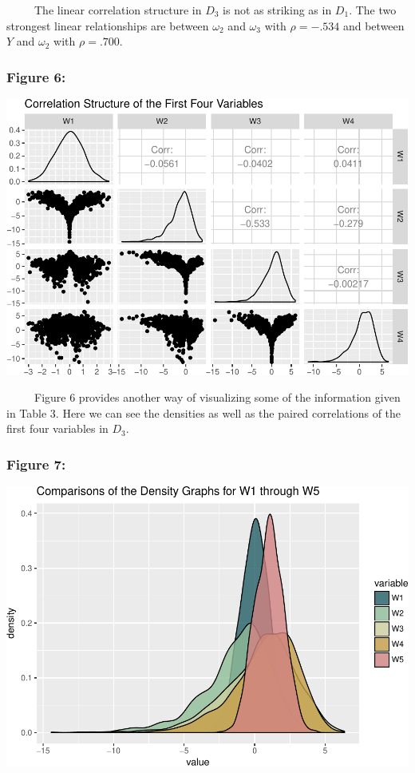 \documentclass[12pt,twoside]{reedthesis}
\begin{document}
  ~~~~~The linear correlation structure in \(D_3\) is not as striking as
  in \(D_1\). The two strongest linear relationships are between
  \(\omega_2\) and \(\omega_3\) with \(\rho = -.534\) and between \(Y\)
  and \(\omega_2\) with \(\rho = .700\).
  
  \subsubsection{Figure 6:}\label{figure-6}
  
  \begin{center}\includegraphics{Thesis_files/figure-latex/unnamed-chunk-7-1} \end{center}
  
  ~~~~~Figure 6 provides another way of visualizing some of the
  information given in Table 3. Here we can see the densities as well as
  the paired correlations of the first four variables in \(D_3\).
  
  \subsubsection{Figure 7:}\label{figure-7}
  
  \begin{center}\includegraphics{Thesis_files/figure-latex/unnamed-chunk-8-1} \end{center}
  
\end{document}
